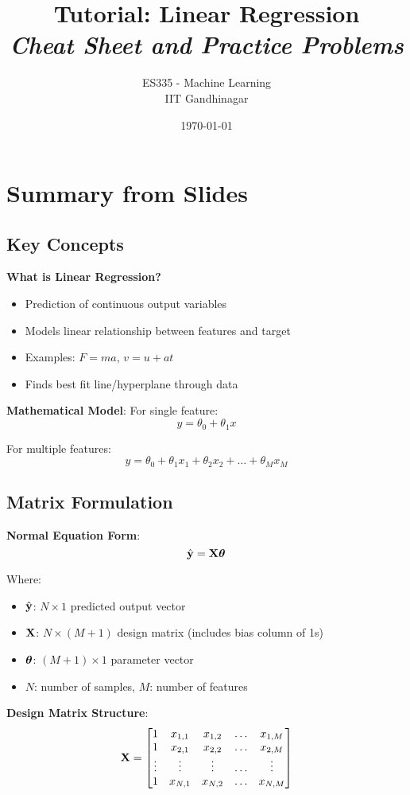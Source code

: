 \documentclass{article}
\title{\textbf{Tutorial: Linear Regression} \\ \textit{Cheat Sheet and Practice Problems}}
\author{ES335 - Machine Learning \\ IIT Gandhinagar}
\date{\today}
\begin{document}
\maketitle

\section{Summary from Slides}

\subsection{Key Concepts}

\textbf{What is Linear Regression?}
\begin{itemize}
    \item Prediction of continuous output variables
    \item Models linear relationship between features and target
    \item Examples: $F = ma$, $v = u + at$
    \item Finds best fit line/hyperplane through data
\end{itemize}

\textbf{Mathematical Model}:
For single feature: 
$$y = \theta_0 + \theta_1 x$$

For multiple features: 
$$y = \theta_0 + \theta_1 x_1 + \theta_2 x_2 + \ldots + \theta_M x_M$$

\subsection{Matrix Formulation}

\textbf{Normal Equation Form}:
$$\hat{\mathbf{y}} = \mathbf{X}\boldsymbol{\theta}$$

Where:
\begin{itemize}
    \item $\hat{\mathbf{y}}$: $N \times 1$ predicted output vector
    \item $\mathbf{X}$: $N \times (M+1)$ design matrix (includes bias column of 1s)
    \item $\boldsymbol{\theta}$: $(M+1) \times 1$ parameter vector
    \item $N$: number of samples, $M$: number of features
\end{itemize}

\textbf{Design Matrix Structure}:
$$\mathbf{X} = \begin{bmatrix}
1 & x_{1,1} & x_{1,2} & \dots & x_{1,M}\\
1 & x_{2,1} & x_{2,2} & \dots & x_{2,M}\\
\vdots & \vdots & \vdots & \dots & \vdots\\
1 & x_{N,1} & x_{N,2} & \dots & x_{N,M}
\end{bmatrix}$$
\end{document}

